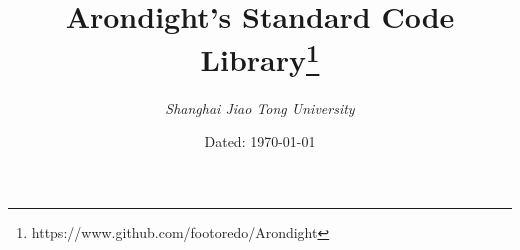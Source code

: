 \documentclass[landscape, oneside, a4paper, cs4size]{book}
\begin{document}
\scriptsize
	\renewcommand{\thefootnote}{\fnsymbol{footnote}}
	\title{\Huge{{Arondight's Standard Code Library}}\thanks{https://www.github.com/footoredo/Arondight}}
	\author{\emph{Shanghai Jiao Tong University}}
	\date{Dated: \today}
	\maketitle
	\clearpage
	\begin{multicols}{2}
		\tableofcontents
		\clearpage
		\begin{spacing}{0.8}
			
		\end{spacing}
	\end{multicols}
\end{document}
